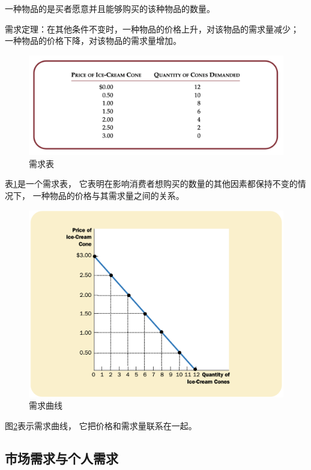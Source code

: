 一种物品的是买者愿意并且能够购买的该种物品的数量。

需求定理：在其他条件不变时，一种物品的价格上升，对该物品的需求量减少；
一种物品的价格下降，对该物品的需求量增加。

\begin{figure}[!ht]
  \centering
  \includegraphics[width=\textwidth]{pics/demand-schedule}
  \caption{需求表}
  \label{fig:demand-schedule}
\end{figure}

表\ref{fig:demand-schedule}是一个需求表，
它表明在影响消费者想购买的数量的其他因素都保持不变的情况下，
一种物品的价格与其需求量之间的关系。

\begin{figure}[!ht]
  \centering
  \includegraphics[width=\textwidth]{pics/demand-curve}
  \caption{需求曲线}
  \label{fig:demand-curve}
\end{figure}

图\ref{fig:demand-curve}表示需求曲线，
它把价格和需求量联系在一起。


\subsection{市场需求与个人需求}

